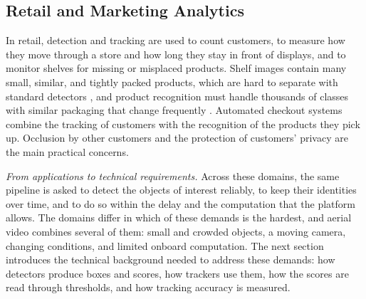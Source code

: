 \subsection{Retail and Marketing Analytics}\label{sec:bg-app-retail}
In retail, detection and tracking are used to count customers, to measure how they move through a store and how long they stay in front of displays, and to monitor shelves for missing or misplaced products. Shelf images contain many small, similar, and tightly packed products, which are hard to separate with standard detectors \cite{goldman2019dense}, and product recognition must handle thousands of classes with similar packaging that change frequently \cite{wei2020retail}. Automated checkout systems combine the tracking of customers with the recognition of the products they pick up. Occlusion by other customers and the protection of customers' privacy are the main practical concerns.

\emph{From applications to technical requirements.} Across these domains, the same pipeline is asked to detect the objects of interest reliably, to keep their identities over time, and to do so within the delay and the computation that the platform allows. The domains differ in which of these demands is the hardest, and aerial video combines several of them: small and crowded objects, a moving camera, changing conditions, and limited onboard computation. The next section introduces the technical background needed to address these demands: how detectors produce boxes and scores, how trackers use them, how the scores are read through thresholds, and how tracking accuracy is measured.
